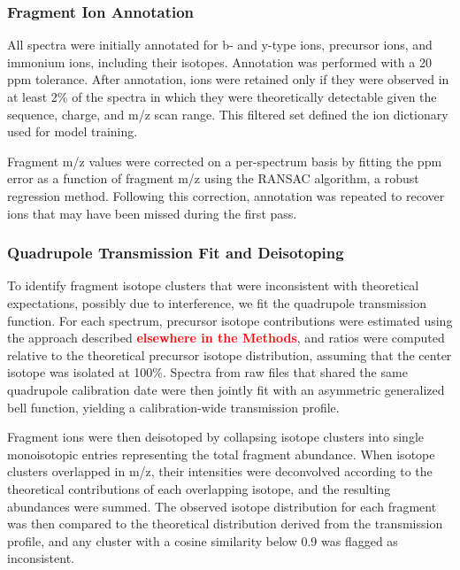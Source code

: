 \documentclass[pdflatex,sn-nature]{sn-jnl}
\begin{document}
\subsubsection{Fragment Ion Annotation}\label{subsubsec:fragment-ion-annotation}
All spectra were initially annotated for b- and y-type ions, precursor ions, and immonium ions, including their isotopes. Annotation was performed with a 20 ppm tolerance. After annotation, ions were retained only if they were observed in at least 2\% of the spectra in which they were theoretically detectable given the sequence, charge, and m/z scan range. This filtered set defined the ion dictionary used for model training.

Fragment m/z values were corrected on a per-spectrum basis by fitting the ppm error as a function of fragment m/z using the RANSAC algorithm, a robust regression method. Following this correction, annotation was repeated to recover ions that may have been missed during the first pass.

\subsubsection{Quadrupole Transmission Fit and Deisotoping}\label{subsubsec:quadrupole-transmission-fit-deisotoping}
To identify fragment isotope clusters that were inconsistent with theoretical expectations, possibly due to interference, we fit the quadrupole transmission function. For each spectrum, precursor isotope contributions were estimated using the approach described \textbf{\textcolor{red}{elsewhere in the Methods}}, and ratios were computed relative to the theoretical precursor isotope distribution, assuming that the center isotope was isolated at 100\%. Spectra from raw files that shared the same quadrupole calibration date were then jointly fit with an asymmetric generalized bell function, yielding a calibration-wide transmission profile.

Fragment ions were then deisotoped by collapsing isotope clusters into single monoisotopic entries representing the total fragment abundance. When isotope clusters overlapped in m/z, their intensities were deconvolved according to the theoretical contributions of each overlapping isotope, and the resulting abundances were summed. The observed isotope distribution for each fragment was then compared to the theoretical distribution derived from the transmission profile, and any cluster with a cosine similarity below 0.9 was flagged as inconsistent.
\end{document}
